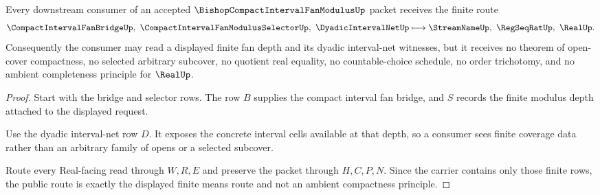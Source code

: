 \begin{theorem}
\label{thm:bishop-compact-interval-fan-modulus-finite-cover-route}
Every downstream consumer of an accepted $\BishopCompactIntervalFanModulusUp$ packet receives the finite route
$$
\CompactIntervalFanBridgeUp,\ \CompactIntervalFanModulusSelectorUp,\ \DyadicIntervalNetUp
\longmapsto
\StreamNameUp,\ \RegSeqRatUp,\ \RealUp .
$$
Consequently the consumer may read a displayed finite fan depth and its dyadic interval-net witnesses, but it receives no theorem of open-cover compactness, no selected arbitrary subcover, no quotient real equality, no countable-choice schedule, no order trichotomy, and no ambient completeness principle for $\RealUp$.
\end{theorem}
\begin{proof}
Start with the bridge and selector rows. The row $B$ supplies the compact interval fan bridge, and $S$ records the finite modulus depth attached to the displayed request.

Use the dyadic interval-net row $D$. It exposes the concrete interval cells available at that depth, so a consumer sees finite coverage data rather than an arbitrary family of opens or a selected subcover.

Route every Real-facing read through $W,R,E$ and preserve the packet through $H,C,P,N$. Since the carrier contains only those finite rows, the public route is exactly the displayed finite means route and not an ambient compactness principle.
\end{proof}


\begin{closurestatus}{\BishopCompactIntervalFanModulusUp}
  \theoryclosure{\seedClosure}
  \formalstatus{\unformalizedV}
\end{closurestatus}
